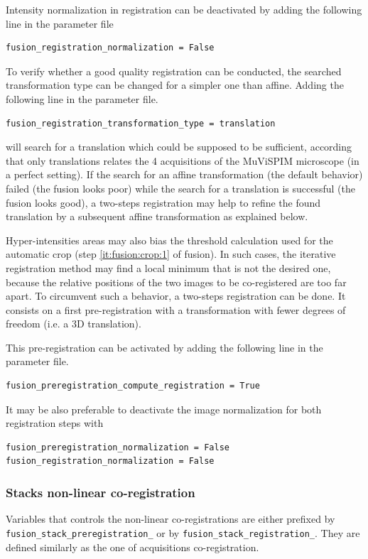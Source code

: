 Intensity normalization in registration can be deactivated by adding the following line in the parameter file
\begin{verbatim}
fusion_registration_normalization = False
\end{verbatim}

To verify whether a good quality registration can be conducted, the searched transformation type can be changed for a simpler one than affine. 
Adding the following line in the parameter file.
\begin{verbatim}
fusion_registration_transformation_type = translation
\end{verbatim}
will search for a translation which could be supposed to be sufficient, according that only translations relates the 4 acquisitions of the MuViSPIM microscope (in a perfect setting). If the search for an affine transformation (the default behavior) failed (the fusion looks poor) while the search for a translation is successful (the fusion looks good), a two-steps registration may help to refine the found translation by a subsequent affine transformation as explained below.

Hyper-intensities areas may also bias the threshold calculation used for the automatic crop (step \ref{it:fusion:crop:1} of fusion). In such cases, the iterative registration method may find a local minimum that is not the desired one, because the relative positions of the two images to be co-registered are too far apart. To circumvent such a behavior, a two-steps registration can be done. It consists on a first pre-registration with a transformation with fewer degrees of freedom (i.e. a 3D translation). 

This pre-registration can be activated by adding the following line in the parameter file.
\begin{verbatim}
fusion_preregistration_compute_registration = True
\end{verbatim}
It may be also preferable to deactivate the image normalization for both registration steps with
\begin{verbatim}
fusion_preregistration_normalization = False
fusion_registration_normalization = False
\end{verbatim}

\subsubsection{Stacks non-linear co-registration}
\label{sec:cli:fuse:stack:registration}
Variables that controls the non-linear co-registrations are either prefixed by \texttt{fusion\_stack\_preregistration\_} or by \texttt{fusion\_stack\_registration\_}. They are defined similarly as the one of acquisitions co-registration. 






